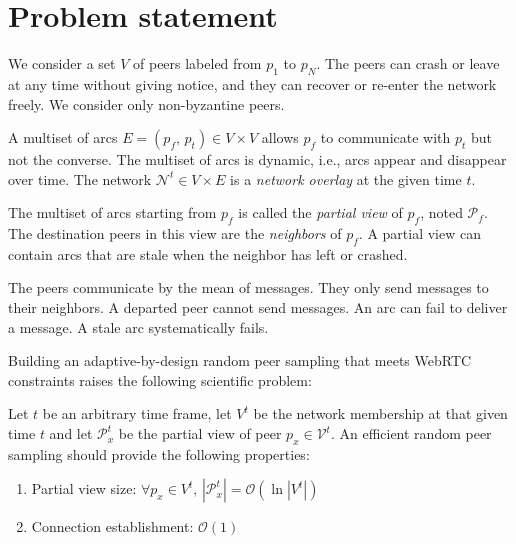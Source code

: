 
\section{Problem statement}

We consider a set $V$ of peers labeled from $p_1$ to $p_N$.  The peers can
crash or leave at any time without giving notice, and they can recover or
re-enter the network freely. We consider only non-byzantine peers.

A multiset of arcs $E = (p_f,\,p_t) \in V \times V$ allows $p_f$ to communicate
with $p_t$ but not the converse. The multiset of arcs is dynamic, i.e., arcs
appear and disappear over time. The network $\mathcal{N}^t \in V \times E$ is a
\emph{network overlay} at the given time $t$.

The multiset of arcs starting from $p_f$ is called the \emph{partial view} of
$p_f$, noted $\mathcal{P}_f$. The destination peers in this view are the
\emph{neighbors} of $p_f$. A partial view can contain arcs that are stale when
the neighbor has left or crashed.

The peers communicate by the mean of messages. They only send messages to their
neighbors. A departed peer cannot send messages. An arc can fail to deliver a
message. A stale arc systematically fails.

Building an adaptive-by-design random peer sampling that meets WebRTC
constraints raises the following scientific problem:
\begin{problem}
  Let $t$ be an arbitrary time frame, let $V^t$ be the network membership at
  that given time $t$ and let $\mathcal{P}_x^t$ be the partial view of peer
  $p_x \in \mathcal{V}^t$.  An efficient random peer sampling should provide
  the following properties:
  \begin{enumerate}
  \item Partial view size: \hfill
    $\forall p_x \in V^t,\, |\mathcal{P}_x^t| = \mathcal{O} (\ln
    |V^t|)$      
  \item Connection establishment: \hfill $\mathcal{O}(1)$
  \end{enumerate}
\end{problem}

